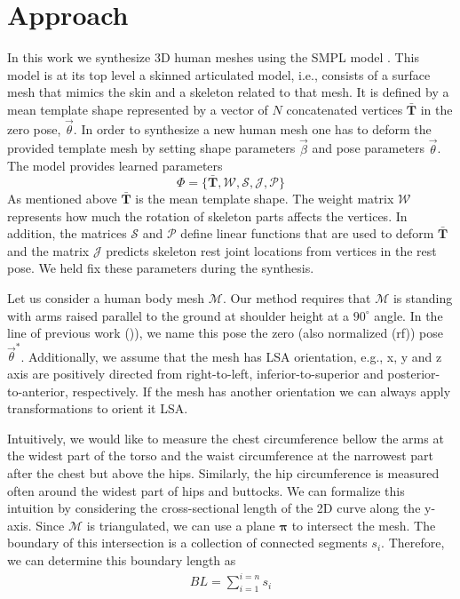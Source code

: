 \documentclass[10pt,twocolumn,letterpaper]{article}
\begin{document}
\section{Approach}
In this work we synthesize 3D human meshes using the SMPL
model \cite{Loper.2015}. This model is at its top level a skinned articulated 
model, i.e., 
consists of a 
surface mesh that mimics the skin and a skeleton related to that mesh. It is 
defined by a mean 
template shape represented by a vector of $N$ concatenated vertices 
$\mathbf{\bar{T}}$ in the zero pose, $\vec{\theta}$. In order to synthesize a 
new human mesh one has to deform the provided template mesh by 
setting shape parameters $\vec{\beta}$ and pose parameters $\vec{\theta}$. The 
model provides learned parameters
\begin{equation} \label{eq:smpl_params}
\Phi = \{\mathbf{\bar{T}}, \mathcal{W}, \mathcal{S}, \mathcal{J}, 
\mathcal{P}\}
\end{equation}
As mentioned above $\mathbf{\bar{T}}$ is the mean template shape. The weight 
matrix $\mathcal{W}$ represents how much the rotation of skeleton parts affects 
the vertices. In addition, the matrices $\mathcal{S}$ and $\mathcal{P}$ define 
linear functions that are used to deform $\mathbf{\bar{T}}$ and the matrix 
$\mathcal{J}$ predicts skeleton rest joint locations from vertices in the rest 
pose. We held fix these parameters during the synthesis.

Let us consider a human body mesh $\mathcal{M}$. Our method requires that 
$\mathcal{M}$ is standing with arms raised 
parallel to the 
ground at shoulder height at a $90^\circ$ angle. In the line 
of previous work (\cite{Dibra.2016a})), we name this pose the zero (also 
normalized (rf)) pose $\vec{\theta}^*$. Additionally, we assume that the mesh 
has LSA orientation, e.g., x, y and z axis are positively directed from 
right-to-left, inferior-to-superior and posterior-to-anterior, respectively. If 
the mesh has another orientation we can always apply transformations to orient 
it LSA.

Intuitively, we would like to measure the chest circumference bellow the arms 
at the widest part of the torso and the waist circumference at the 
narrowest part after the chest but above the hips. Similarly, the hip 
circumference is measured often around the widest part of hips and buttocks. We 
can formalize this intuition by considering the cross-sectional length of the 
2D curve along the y-axis. Since $\mathcal{M}$ is triangulated, we can use a 
plane $\boldsymbol{\pi}$ to intersect the mesh. The boundary of this 
intersection is a collection of connected segments $s_i$. Therefore, we can 
determine this boundary length as
\begin{align}
BL = \sum_{i = 1}^{i = n}s_i
\end{align}  
\end{document}
